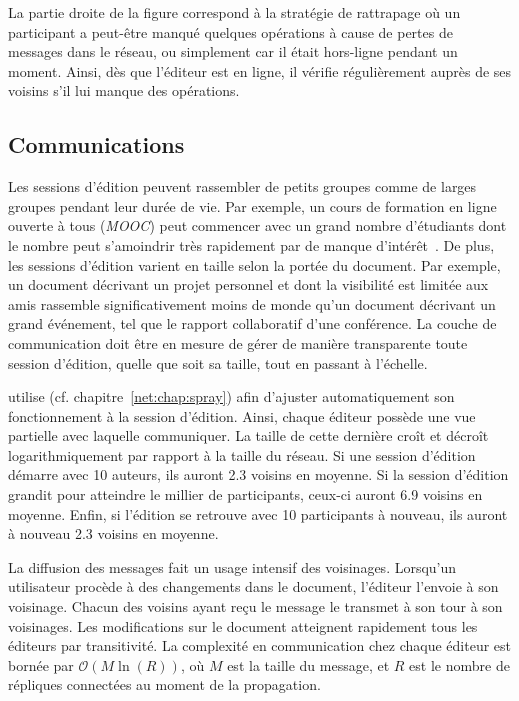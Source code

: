 La partie droite de la figure correspond à la stratégie de rattrapage où un
participant a peut-être manqué quelques opérations à cause de pertes de messages
dans le réseau, ou simplement car il était hors-ligne pendant un moment. Ainsi,
dès que l'éditeur est en ligne, il vérifie régulièrement auprès de ses voisins
s'il lui manque des opérations.


\subsection{Communications}

Les sessions d'édition peuvent rassembler de petits groupes comme de larges
groupes pendant leur durée de vie. Par exemple, un cours de formation en ligne
ouverte à tous (\emph{MOOC}) peut commencer avec un grand nombre d'étudiants
dont le nombre peut s'amoindrir très rapidement par de manque
d'intérêt~\cite{breslow2013studying}. De plus, les sessions d'édition varient en
taille selon la portée du document. Par exemple, un document décrivant un projet
personnel et dont la visibilité est limitée aux amis rassemble significativement
moins de monde qu'un document décrivant un grand événement, tel que le rapport
collaboratif d'une conférence. La couche de communication doit être en mesure de
gérer de manière transparente toute session d'édition, quelle que soit sa
taille, tout en passant à l'échelle.

\CRATE utilise \SPRAY (cf. chapitre~\ref{net:chap:spray}) afin d'ajuster
automatiquement son fonctionnement à la session d'édition. Ainsi, chaque éditeur
possède une vue partielle avec laquelle communiquer. La taille de cette dernière
croît et décroît logarithmiquement par rapport à la taille du réseau. Si une
session d'édition démarre avec 10 auteurs, ils auront 2.3 voisins en moyenne. Si
la session d'édition grandit pour atteindre le millier de participants, ceux-ci
auront 6.9 voisins en moyenne. Enfin, si l'édition se retrouve avec 10
participants à nouveau, ils auront à nouveau 2.3 voisins en moyenne.

La diffusion des messages fait un usage intensif des voisinages. Lorsqu'un
utilisateur procède à des changements dans le document, l'éditeur l'envoie à son
voisinage. Chacun des voisins ayant reçu le message le transmet à son tour à
son voisinages. Les modifications sur le document atteignent rapidement tous les
éditeurs par transitivité. La complexité en communication chez chaque éditeur
est bornée par $\mathcal{O}(M\ln(R))$, où $M$ est la taille du message, et
$R$ est le nombre de répliques connectées au moment de la propagation.

